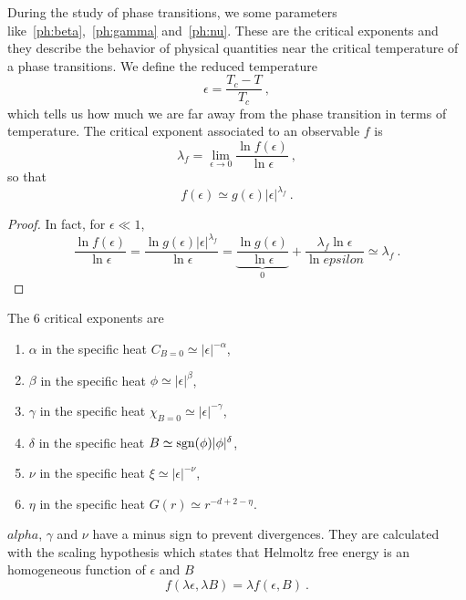    During the study of phase transitions, we some parameters like~\eqref{ph:beta},~\eqref{ph:gamma} and~\eqref{ph:nu}. These are the critical exponents and they describe the behavior of physical quantities near the critical temperature of a phase transitions. We define the reduced temperature 
    \begin{equation*}
        \epsilon = \frac{T_c - T}{T_c} ~,
    \end{equation*}
    which tells us how much we are far away from the phase transition in terms of temperature. The critical exponent associated to an observable $f$ is 
    \begin{equation*}
        \lambda_f = \lim_{\epsilon \rightarrow 0} \frac{\ln f(\epsilon)}{\ln \epsilon} ~,
    \end{equation*}
    so that 
    \begin{equation*}
        f (\epsilon) \simeq g(\epsilon) |\epsilon|^{\lambda_f} ~.
    \end{equation*}
    \begin{proof}
        In fact, for $\epsilon \ll 1$,
        \begin{equation*}
            \frac{\ln f(\epsilon)}{\ln \epsilon} = \frac{\ln g(\epsilon) |\epsilon|^{\lambda_f}}{\ln \epsilon} = \underbrace{\frac{\ln g(\epsilon)}{\ln \epsilon}}_0 + \frac{\lambda_f \ln \epsilon}{\ln epsilon} \simeq \lambda_f ~.
        \end{equation*}
    \end{proof}
    
    The $6$ critical exponents are
    \begin{enumerate}
        \item $\alpha$ in the specific heat $C_{B = 0} \simeq |\epsilon|^{-\alpha}$,
        \item $\beta$ in the specific heat $\phi \simeq |\epsilon|^{\beta}$,
        \item $\gamma$ in the specific heat $\chi_{B = 0} \simeq |\epsilon|^{-\gamma}$,
        \item $\delta$ in the specific heat $B \simeq \operatorname{sgn}(\phi) |\phi|^{\delta}$,
        \item $\nu$ in the specific heat $\xi \simeq |\epsilon|^{-\nu}$,
        \item $\eta$ in the specific heat $G(r) \simeq r^{-d+2-\eta}$.
    \end{enumerate}
    $alpha$, $\gamma$ and $\nu$ have a minus sign to prevent divergences. They are calculated with the scaling hypothesis which states that Helmoltz free energy is an homogeneous function of $\epsilon$ and $B$ 
    \begin{equation*}
        f ( \lambda \epsilon, \lambda B) = \lambda f(\epsilon, B) ~.
    \end{equation*}

